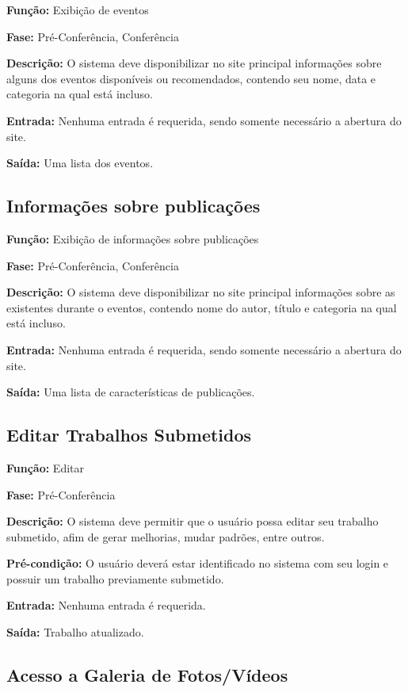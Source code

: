 \documentclass[letter]{article}
\begin{document}
\textbf{Função:} Exibição de eventos

\textbf{Fase:} Pré-Conferência, Conferência

\textbf{Descrição:} O sistema deve disponibilizar no site principal informações sobre alguns dos eventos disponíveis ou recomendados, contendo seu 
nome, data e categoria na qual está incluso.

\textbf{Entrada:} Nenhuma entrada é requerida, sendo somente necessário a
abertura do site.

\textbf{Saída:} Uma lista dos eventos.



\subsection{Informações sobre publicações}

\textbf{Função:} Exibição de informações sobre publicações

\textbf{Fase:} Pré-Conferência, Conferência

\textbf{Descrição:} O sistema deve disponibilizar no site principal informações sobre as existentes durante o eventos, contendo nome do autor, título e categoria na qual está incluso.

\textbf{Entrada:} Nenhuma entrada é requerida, sendo somente necessário a
abertura do site.

\textbf{Saída:} Uma lista de características de publicações.



\subsection{Editar Trabalhos Submetidos}

\textbf{Função:} Editar

\textbf{Fase:} Pré-Conferência

\textbf{Descrição:} O sistema deve permitir que o usuário possa editar seu trabalho submetido, afim de gerar melhorias, mudar padrões, entre outros.

\textbf{Pré-condição:} O usuário deverá estar identificado no sistema com seu login e possuir um trabalho previamente submetido.

\textbf{Entrada:} Nenhuma entrada é requerida.

\textbf{Saída:} Trabalho atualizado.



\subsection{Acesso a Galeria de Fotos/Vídeos}
\end{document}
